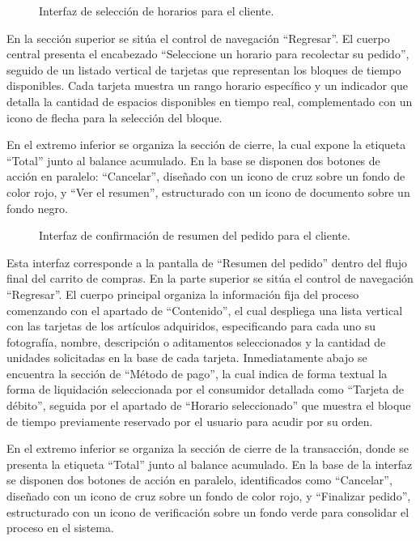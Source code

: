 \begin{figure}[H]
    \centering
    
    \caption{Interfaz de selección de horarios para el cliente.}
    \label{fig:ui-cli-10}
\end{figure}

En la sección superior se sitúa el control de navegación ``Regresar''. El cuerpo central presenta el encabezado ``Seleccione un horario para recolectar su pedido'', seguido de un listado vertical de tarjetas que representan los bloques de tiempo disponibles. Cada tarjeta muestra un rango horario específico y un indicador que detalla la cantidad de espacios disponibles en tiempo real, complementado con un icono de flecha para la selección del bloque.

En el extremo inferior se organiza la sección de cierre, la cual expone la etiqueta ``Total'' junto al balance acumulado. En la base se disponen dos botones de acción en paralelo: ``Cancelar'', diseñado con un icono de cruz sobre un fondo de color rojo, y ``Ver el resumen'', estructurado con un icono de documento sobre un fondo negro.

\begin{figure}[H]
    \centering
    
    \caption{Interfaz de confirmación de resumen del pedido para el cliente.}
    \label{fig:ui-cli-11}
\end{figure}

Esta interfaz corresponde a la pantalla de ``Resumen del pedido'' dentro del flujo final del carrito de compras. En la parte superior se sitúa el control de navegación ``Regresar''. El cuerpo principal organiza la información fija del proceso comenzando con el apartado de ``Contenido'', el cual despliega una lista vertical con las tarjetas de los artículos adquiridos, especificando para cada uno su fotografía, nombre, descripción o aditamentos seleccionados y la cantidad de unidades solicitadas en la base de cada tarjeta. Inmediatamente abajo se encuentra la sección de ``Método de pago'', la cual indica de forma textual la forma de liquidación seleccionada por el consumidor detallada como ``Tarjeta de débito'', seguida por el apartado de ``Horario seleccionado'' que muestra el bloque de tiempo previamente reservado por el usuario para acudir por su orden.

En el extremo inferior se organiza la sección de cierre de la transacción, donde se presenta la etiqueta ``Total'' junto al balance acumulado. En la base de la interfaz se disponen dos botones de acción en paralelo, identificados como ``Cancelar'', diseñado con un icono de cruz sobre un fondo de color rojo, y ``Finalizar pedido'', estructurado con un icono de verificación sobre un fondo verde para consolidar el proceso en el sistema.

